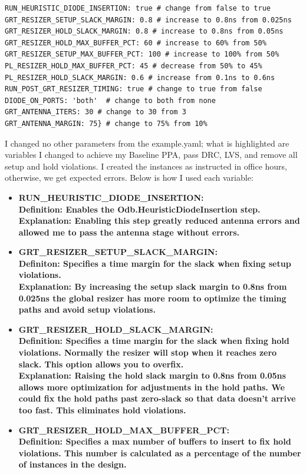 \documentclass{article}
\begin{document}
\begin{flushleft}
{\begin{lstlisting}
RUN_HEURISTIC_DIODE_INSERTION: true # change from false to true
GRT_RESIZER_SETUP_SLACK_MARGIN: 0.8 # increase to 0.8ns from 0.025ns
GRT_RESIZER_HOLD_SLACK_MARGIN: 0.8 # increase to 0.8ns from 0.05ns
GRT_RESIZER_HOLD_MAX_BUFFER_PCT: 60 # increase to 60% from 50%
GRT_RESIZER_SETUP_MAX_BUFFER_PCT: 100 # increase to 100% from 50%
PL_RESIZER_HOLD_MAX_BUFFER_PCT: 45 # decrease from 50% to 45%
PL_RESIZER_HOLD_SLACK_MARGIN: 0.6 # increase from 0.1ns to 0.6ns
RUN_POST_GRT_RESIZER_TIMING: true # change to true from false
DIODE_ON_PORTS: 'both'  # change to both from none
GRT_ANTENNA_ITERS: 30 # change to 30 from 3
GRT_ANTENNA_MARGIN: 75} # change to 75% from 10%
\end{lstlisting}}
\noindent\makebox[\linewidth]{\rule{\paperwidth}{0.4pt}}
{\large I changed no other parameters from the example.yaml; what is highlighted are variables I changed to achieve my Baseline PPA, pass DRC, LVS, and remove all setup and hold violations. I created the instances as instructed in office hours, otherwise, we get expected errors.
Below is how I used each variable:}
\begin{itemize}
\item \bf{RUN\_HEURISTIC\_DIODE\_INSERTION:}
\\Definition: Enables the Odb.HeuristicDiodeInsertion step.
\\Explanation: Enabling this step greatly reduced antenna errors and allowed me to pass the antenna stage without errors.
\item \bf{GRT\_RESIZER\_SETUP\_SLACK\_MARGIN:}
\\Definiton: Specifies a time margin for the slack when fixing setup violations.
\\Explanation: By increasing the setup slack margin to 0.8ns from 0.025ns the global resizer has more room to optimize the timing paths and avoid setup violations.
\item \bf{GRT\_RESIZER\_HOLD\_SLACK\_MARGIN:}
\\Definition: Specifies a time margin for the slack when fixing hold violations. Normally the resizer will stop when it reaches zero slack. This option allows you to overfix.
\\Explanation: Raising the hold slack margin to 0.8ns from 0.05ns allows more optimization for adjustments in the hold paths. We could fix the hold paths past zero-slack so that data doesn't arrive too fast. This eliminates hold violations.
\item \bf{GRT\_RESIZER\_HOLD\_MAX\_BUFFER\_PCT:}
\\Definition: Specifies a max number of buffers to insert to fix hold violations. This number is calculated as a percentage of the number of instances in the design.

\end{itemize}
\end{flushleft}
\end{document}
